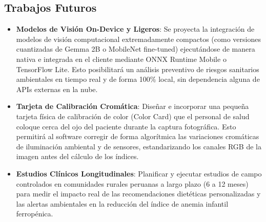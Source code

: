 \subsection{Trabajos Futuros}
\begin{itemize}
    \item \textbf{Modelos de Visión On-Device y Ligeros}: Se proyecta la integración de modelos de visión computacional extremadamente compactos (como versiones cuantizadas de Gemma 2B o MobileNet fine-tuned) ejecutándose de manera nativa e integrada en el cliente mediante ONNX Runtime Mobile o TensorFlow Lite. Esto posibilitará un análisis preventivo de riesgos sanitarios ambientales en tiempo real y de forma 100\% local, sin dependencia alguna de APIs externas en la nube.
    \item \textbf{Tarjeta de Calibración Cromática}: Diseñar e incorporar una pequeña tarjeta física de calibración de color (Color Card) que el personal de salud coloque cerca del ojo del paciente durante la captura fotográfica. Esto permitirá al software corregir de forma algorítmica las variaciones cromáticas de iluminación ambiental y de sensores, estandarizando los canales RGB de la imagen antes del cálculo de los índices.
    \item \textbf{Estudios Clínicos Longitudinales}: Planificar y ejecutar estudios de campo controlados en comunidades rurales peruanas a largo plazo (6 a 12 meses) para medir el impacto real de las recomendaciones dietéticas personalizadas y las alertas ambientales en la reducción del índice de anemia infantil ferropénica.
\end{itemize}

